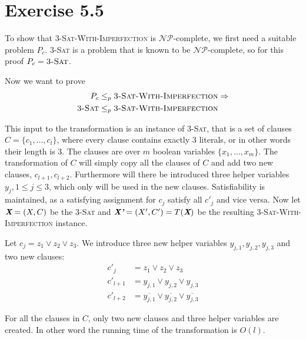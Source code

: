\section*{Exercise 5.5}
To show that \textsc{3-Sat-With-Imperfection} is $\mathcal{NP}$-complete, we first need a suitable problem $P_c$. \textsc{3-Sat} is a problem that is known to be $\mathcal{NP}$-complete, so for this proof $P_c = \textsc{3-Sat}$.

Now we want to prove
\begin{align*}
	P_c &\leq_p \textsc{3-Sat-With-Imperfection} \Rightarrow \\
	\textsc{3-Sat} &\leq_p \textsc{3-Sat-With-Imperfection}
\end{align*}

This input to the transformation is an instance of \textsc{3-Sat}, that is a set of clauses $C = \{ c_1, \ldots, c_l \}$, where every clause contains exactly 3 literals, or in other words their length is 3. The clauses are over $m$ boolean variables $\{ x_1, \ldots, x_m \}$. The transformation of $C$ will simply copy all the clauses of $C$ and add two new clauses, $c_{l+1}, c_{l+2}$. Furthermore will there be introduced three helper variables $y_j, 1 \leq j \leq 3$, which only will be used in the new clauses. Satisfiability is maintained, as a satisfying assignment for $c_j$ satisfy all $c'_{j}$ and vice versa. Now let $\textit{\textbf{X}} = (X,C)$ be the \textsc{3-Sat} and $\textit{\textbf{X'}} = (X',C') = T(\textit{\textbf{X}})$ be the resulting \textsc{3-Sat-With-Imperfection} instance.

Let $c_j = z_1 \lor z_2 \lor z_3$. We introduce three new helper variables $y_{j,1}, y_{j,2}, y_{j,3}$ and two new clauses:
\begin{align*}
	c'_{j} &= z_1 \lor z_2 \lor z_3 \\
	c'_{l+1} &= y_{j,1} \lor y_{j,2} \lor y_{j,3} \\
	c'_{l+2} &= \overline{y_{j,1}} \lor \overline{y_{j,2}} \lor \overline{y_{j,3}}
\end{align*}

For all the clauses in $C$, only two new clauses and three helper variables are created. In other word the running time of the transformation is $O(l)$.

